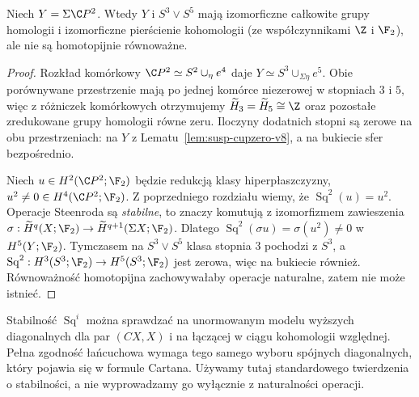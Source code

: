 \begin{twierdzenie}
\label{thm:sigma-cp2-v8}
Niech $Y=\Sigma\C P^2$. Wtedy $Y$ i $S^3\vee S^5$
mają izomorficzne całkowite grupy homologii i izomorficzne
pierścienie kohomologii (ze współczynnikami $\Z$ i $\F_2$),
ale nie są homotopijnie równoważne.
\end{twierdzenie}
\begin{proof}
Rozkład komórkowy $\C P^2\simeq S^2\cup_\eta e^4$
daje $Y\simeq S^3\cup_{\Sigma\eta}e^5$.
Obie porównywane przestrzenie mają po jednej komórce
niezerowej w stopniach $3$ i $5$, więc z różniczek
komórkowych otrzymujemy
$\widetilde H_3=\widetilde H_5\cong\Z$ oraz pozostałe
zredukowane grupy homologii równe zeru.
Iloczyny dodatnich stopni są zerowe na obu przestrzeniach:
na $Y$ z Lematu~\ref{lem:susp-cupzero-v8}, a na bukiecie
sfer bezpośrednio.

Niech $u\in H^2(\C P^2;\F_2)$ będzie redukcją klasy
hiperpłaszczyzny, $u^2\ne0\in H^4(\C P^2;\F_2)$.
Z poprzedniego rozdziału wiemy, że
$\operatorname{Sq}^2(u)=u^2$.
Operacje Steenroda są \emph{stabilne}, to znaczy
komutują z izomorfizmem zawieszenia
$\sigma:\widetilde H^q(X;\F_2)\to
\widetilde H^{q+1}(\Sigma X;\F_2)$.
Dlatego
$\operatorname{Sq}^2(\sigma u)=\sigma(u^2)\ne0$
w $H^5(Y;\F_2)$.
Tymczasem na $S^3\vee S^5$ klasa stopnia $3$
pochodzi z $S^3$, a
$\operatorname{Sq}^2:H^3(S^3;\F_2)\to H^5(S^3;\F_2)$
jest zerowa, więc na bukiecie również.
Równoważność homotopijna zachowywałaby operacje
naturalne, zatem nie może istnieć.
\end{proof}

\begin{uwaga}
Stabilność $\operatorname{Sq}^i$ można sprawdzać na
unormowanym modelu wyższych diagonalnych dla par
$(CX,X)$ i na łączącej w ciągu kohomologii względnej.
Pełna zgodność łańcuchowa wymaga tego samego wyboru
spójnych diagonalnych, który pojawia się w formule Cartana.
Używamy tutaj standardowego twierdzenia o stabilności,
a nie wyprowadzamy go wyłącznie z naturalności operacji.
\end{uwaga}

